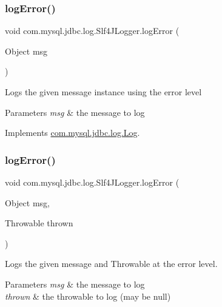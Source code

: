 \subsubsection{\texorpdfstring{log\+Error()}{logError()}\hspace{0.1cm}{\footnotesize\ttfamily [1/2]}}
{\footnotesize\ttfamily void com.\+mysql.\+jdbc.\+log.\+Slf4\+J\+Logger.\+log\+Error (\begin{DoxyParamCaption}\item[{Object}]{msg }\end{DoxyParamCaption})}

Logs the given message instance using the \textquotesingle{}error\textquotesingle{} level


\begin{DoxyParams}{Parameters}
{\em msg} & the message to log \\
\hline
\end{DoxyParams}


Implements \mbox{\hyperlink{interfacecom_1_1mysql_1_1jdbc_1_1log_1_1_log_aefe78baa37affef138eaba105b699022}{com.\+mysql.\+jdbc.\+log.\+Log}}.

\mbox{\label{classcom_1_1mysql_1_1jdbc_1_1log_1_1_slf4_j_logger_ad89a6c7655848b87de7ca278e6061688}} 
\subsubsection{\texorpdfstring{log\+Error()}{logError()}\hspace{0.1cm}{\footnotesize\ttfamily [2/2]}}
{\footnotesize\ttfamily void com.\+mysql.\+jdbc.\+log.\+Slf4\+J\+Logger.\+log\+Error (\begin{DoxyParamCaption}\item[{Object}]{msg,  }\item[{Throwable}]{thrown }\end{DoxyParamCaption})}

Logs the given message and Throwable at the \textquotesingle{}error\textquotesingle{} level.


\begin{DoxyParams}{Parameters}
{\em msg} & the message to log \\
\hline
{\em thrown} & the throwable to log (may be null) \\
\hline
\end{DoxyParams}


